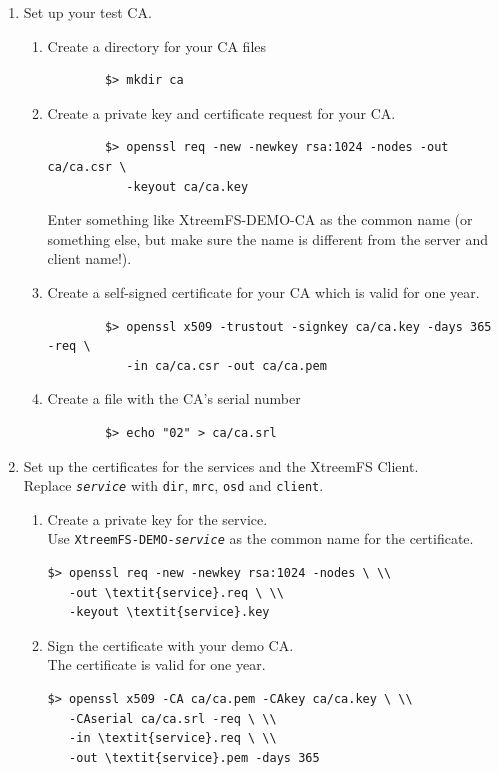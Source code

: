 \documentclass[a4paper,10pt]{book}
\begin{document}
\begin{enumerate}
 \item Set up your test CA.
	\begin{enumerate}
	\item Create a directory for your CA files
		\begin{verbatim}
		$> mkdir ca
		\end{verbatim}

	\item Create a private key and certificate request for your CA.
		\begin{verbatim}
		$> openssl req -new -newkey rsa:1024 -nodes -out ca/ca.csr \
		   -keyout ca/ca.key
		\end{verbatim}

		Enter something like XtreemFS-DEMO-CA as the common name (or something else, but make sure the name is different from the server and client name!).
	\item Create a self-signed certificate for your CA which is valid for one year.
		\begin{verbatim}
		$> openssl x509 -trustout -signkey ca/ca.key -days 365 -req \
		   -in ca/ca.csr -out ca/ca.pem
		\end{verbatim}

	\item Create a file with the CA's serial number
		\begin{verbatim}
		$> echo "02" > ca/ca.srl
		\end{verbatim}

 \end{enumerate}
 \item Set up the certificates for the services and the XtreemFS Client.\\
	Replace \texttt{\textit{service}} with \texttt{dir}, \texttt{mrc}, \texttt{osd} and \texttt{client}.
	\begin{enumerate}
	\item Create a private key for the service.\\
	      Use \texttt{XtreemFS-DEMO-\textit{service}} as the common name for the certificate.
		\begin{Verbatim}[commandchars=\\\{\}]
$> openssl req -new -newkey rsa:1024 -nodes \ \\
   -out \textit{service}.req \ \\
   -keyout \textit{service}.key
		\end{Verbatim}

	\item Sign the certificate with your demo CA.\\
		The certificate is valid for one year.
		\begin{Verbatim}[commandchars=\\\{\}]
$> openssl x509 -CA ca/ca.pem -CAkey ca/ca.key \ \\
   -CAserial ca/ca.srl -req \ \\
   -in \textit{service}.req \ \\
   -out \textit{service}.pem -days 365
		\end{Verbatim}


\end{enumerate}
\end{enumerate}
\end{document}
